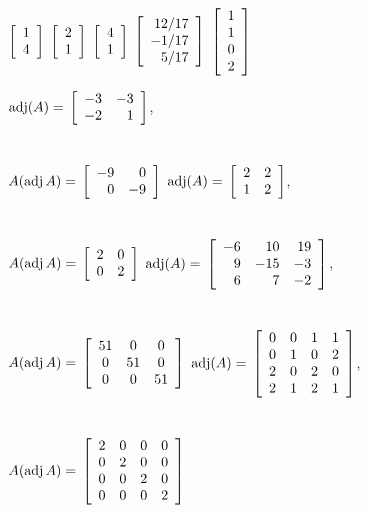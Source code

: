 
\begin{enumerate}[!HW!, start=1]
\begin{multicols}{5}
\item $\vr{1\\4}$ %
\itemspade $\vr{2\\1}$
\itemspade $\vr{4\\1}$
\itemspade $\vr{12/17 \\ -1/17 \\ 5/17}$
\itemspade $\vr{1\\1\\0\\2}$
\end{multicols}
\begin{multicols}{4}
\itemspade $\adj(A) =\\ \mtx{rr}{-3&-3\\-2&1}$,\\\\\\ $A(\adj A) =\\ \mtx{rr}{-9&0\\0&-9}$\columnbreak
\itemspade $\adj(A) =\\ \mtx{rr}{2&2\\1&2}$,\\\\\\ $A(\adj A) =\\ \mtx{rr}{2&0\\0&2}$\columnbreak
\itemspade $\adj(A) =\\ \mtx{rrr}{-6&10&19\\9&-15&-3\\6&7&-2}$,\\\\\\ $A(\adj A) =\\ \mtx{ccc}{51&0&0\\0&51&0\\0&0&51}$\columnbreak
\itemspade $\adj(A) =\\ \mtx{cccc}{0&0&1&1\\0&1&0&2\\2&0&2&0\\2&1&2&1}$,\\\\\\ $A(\adj A) =\\ \mtx{cccc}{2&0&0&0\\0&2&0&0\\0&0&2&0\\0&0&0&2}$

\end{multicols}
\end{enumerate}
